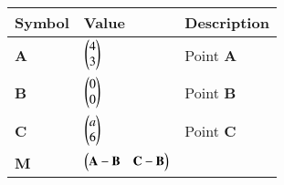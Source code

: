 
\begin{tabular}{|m{5em} |m{10em}| m{10em} | }
\hline
\textbf{Symbol} & \textbf{Value} & \textbf{Description} \\
\hline 
\textbf{A} & $\begin{pmatrix}4\\3\end{pmatrix}$ & Point \textbf{A} \\
\hline 
\textbf{B} & $\begin{pmatrix}0\\0\end{pmatrix}$ & Point \textbf{B} \\
\hline
\textbf{C} & $\begin{pmatrix}a\\6\end{pmatrix}$ & Point \textbf{C} \\
\hline
\textbf{M} & $\begin{pmatrix}\textbf{A} - \textbf{B} & \textbf{C} - \textbf{B}\end{pmatrix}$ & \\
\hline
\end{tabular}

